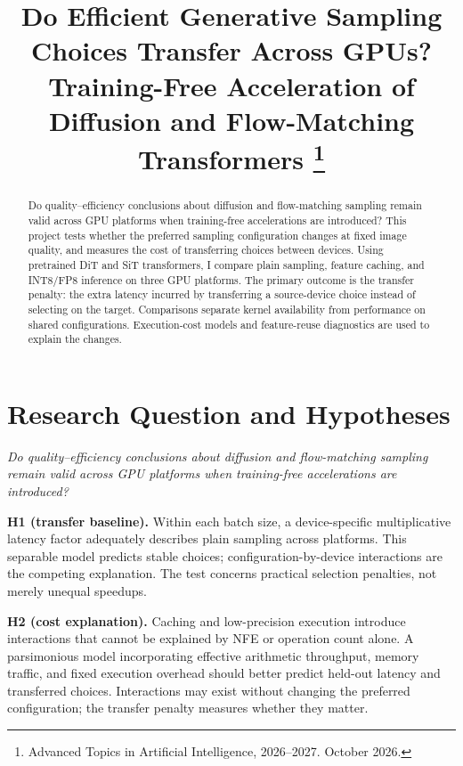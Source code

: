 \documentclass[conference]{IEEEtran}
\begin{document}
\title{Do Efficient Generative Sampling Choices Transfer Across GPUs?\\
\large Training-Free Acceleration of Diffusion and Flow-Matching Transformers%
\thanks{Advanced Topics in Artificial Intelligence, 2026--2027. October 2026.}}

\author{}

\maketitle

\begin{abstract}
Do quality--efficiency conclusions about diffusion and flow-matching sampling remain valid across GPU platforms
when training-free accelerations are introduced? This project tests whether the preferred sampling
configuration changes at fixed image quality, and measures the cost of transferring choices between devices.
Using pretrained DiT and SiT transformers, I compare plain sampling, feature caching, and INT8/FP8 inference on
three GPU platforms. The primary outcome is the transfer penalty: the extra latency incurred by transferring a
source-device choice instead of selecting on the target. Comparisons separate kernel availability from
performance on shared configurations. Execution-cost models and feature-reuse diagnostics are used to explain
the changes.
\end{abstract}

\section{Research Question and Hypotheses}

\emph{Do quality--efficiency conclusions about diffusion and flow-matching sampling remain valid across GPU
platforms when training-free accelerations are introduced?}

\textbf{H1 (transfer baseline).} Within each batch size, a device-specific multiplicative latency factor
adequately describes plain sampling across platforms. This separable model predicts stable choices;
configuration-by-device interactions are the competing explanation. The test concerns practical selection
penalties, not merely unequal speedups.

\textbf{H2 (cost explanation).} Caching and low-precision execution introduce interactions that cannot be
explained by NFE or operation count alone. A parsimonious model incorporating effective arithmetic throughput,
memory traffic, and fixed execution overhead should better predict held-out latency and transferred choices.
Interactions may exist without changing the preferred configuration; the transfer penalty measures whether
they matter.
\end{document}
